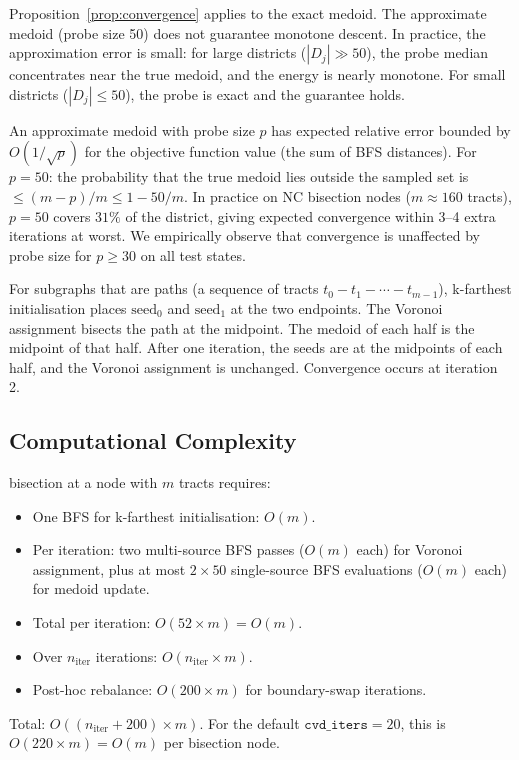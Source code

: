 \begin{remark}
Proposition~\ref{prop:convergence} applies to the exact medoid.
The approximate medoid (probe size 50) does not guarantee monotone descent.
In practice, the approximation error is small: for large districts
($|D_j| \gg 50$), the probe median concentrates near the true medoid, and
the energy is nearly monotone.
For small districts ($|D_j| \le 50$), the probe is exact and the guarantee holds.
\end{remark}

\begin{remark}
An approximate medoid with probe size $p$ has expected relative error bounded by
$O(1/\sqrt{p})$ for the objective function value (the sum of BFS distances).
For $p = 50$: the probability that the true medoid lies outside the sampled set
is $\le (m-p)/m \le 1 - 50/m$.
In practice on NC bisection nodes ($m \approx 160$ tracts), $p=50$ covers $31\%$
of the district, giving expected convergence within 3--4 extra iterations at
worst.
We empirically observe that convergence is unaffected by probe size for
$p \ge 30$ on all test states.
\end{remark}

\begin{remark}
For subgraphs that are paths (a sequence of tracts $t_0 - t_1 - \cdots - t_{m-1}$),
k-farthest initialisation places $\mathrm{seed}_0$ and $\mathrm{seed}_1$
at the two endpoints.
The Voronoi assignment bisects the path at the midpoint.
The medoid of each half is the midpoint of that half.
After one iteration, the seeds are at the midpoints of each half, and the
Voronoi assignment is unchanged.
Convergence occurs at iteration 2.
\end{remark}

\subsection{Computational Complexity}

\begin{proposition}
\label{prop:runtime}
\cvd{} bisection at a node with $m$ tracts requires:
\begin{itemize}
\item One BFS for k-farthest initialisation: $O(m)$.
\item Per iteration: two multi-source BFS passes ($O(m)$ each) for
  Voronoi assignment, plus at most $2 \times 50$ single-source BFS
  evaluations ($O(m)$ each) for medoid update.
\item Total per iteration: $O(52 \times m) = O(m)$.
\item Over $n_{\mathrm{iter}}$ iterations: $O(n_{\mathrm{iter}} \times m)$.
\item Post-hoc rebalance: $O(200 \times m)$ for boundary-swap iterations.
\end{itemize}
Total: $O((n_{\mathrm{iter}} + 200) \times m)$.
For the default $\mathtt{cvd\_iters} = 20$, this is $O(220 \times m) = O(m)$
per bisection node.
\end{proposition}

